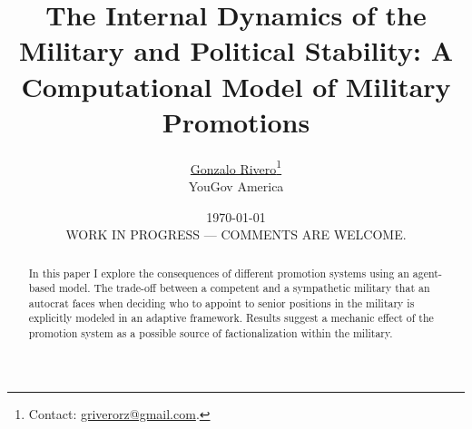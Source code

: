 \documentclass[11pt]{article}
\begin{document}
\title{The Internal Dynamics of the Military and Political Stability: A
  Computational Model of Military Promotions}

\author{\href{mailto:griverorz@gmail.com}{Gonzalo Rivero}\footnote{Contact:
    \href{mailto:griverorz@gmail.com}{griverorz@gmail.com}.} \\ YouGov America }

\date{\today \\ \vspace*{2cm}  WORK IN PROGRESS --- COMMENTS ARE WELCOME.}

\maketitle


\begin{abstract}
  In this paper I explore the consequences of different promotion systems using
  an agent-based model. The trade-off between a competent and a sympathetic
  military that an autocrat faces when deciding who to appoint to senior
  positions in the military is explicitly modeled in an adaptive framework.
  Results suggest a mechanic effect of the promotion system as a possible source
  of factionalization within the military.
\end{abstract}

\newpage








\newpage



\end{document}
